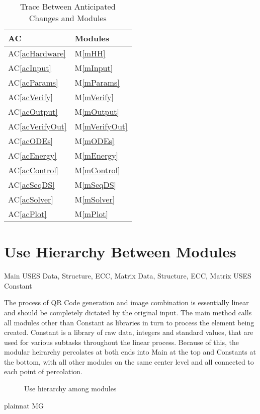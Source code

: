 \documentclass[12pt, titlepage]{article}
\newcommand{\acref}[1]{AC\ref{#1}}
\newcommand{\mref}[1]{M\ref{#1}}
\begin{document}
\begin{table}[H]
\centering
\begin{tabular}{p{} p{}}
\toprule
\textbf{AC} & \textbf{Modules}\\
\midrule
\acref{acHardware} & \mref{mHH}\\
\acref{acInput} & \mref{mInput}\\
\acref{acParams} & \mref{mParams}\\
\acref{acVerify} & \mref{mVerify}\\
\acref{acOutput} & \mref{mOutput}\\
\acref{acVerifyOut} & \mref{mVerifyOut}\\
\acref{acODEs} & \mref{mODEs}\\
\acref{acEnergy} & \mref{mEnergy}\\
\acref{acControl} & \mref{mControl}\\
\acref{acSeqDS} & \mref{mSeqDS}\\
\acref{acSolver} & \mref{mSolver}\\
\acref{acPlot} & \mref{mPlot}\\
\bottomrule
\end{tabular}
\caption{Trace Between Anticipated Changes and Modules}
\label{TblACT}
\end{table}

\section{Use Hierarchy Between Modules} \label{SecUse}

Main USES Data, Structure, ECC, Matrix
Data, Structure, ECC, Matrix USES Constant

The process of QR Code generation and image combination is essentially linear 
and should be completely dictated by the original input. The main method calls 
all modules other than Constant as libraries in turn to process the element being
created. Constant is a library of raw data, integers and standard values, that 
are used for various subtasks throughout the linear process. Because of this, the 
modular heirarchy percolates at both ends into Main at the top and Constants at 
the bottom, with all other modules on the same center level and all connected 
to each point of percolation.

\begin{figure}[H]
\centering
\caption{Use hierarchy among modules}
\label{FigUH}
\end{figure}


 {plainnat}
 {MG}
\end{document}
